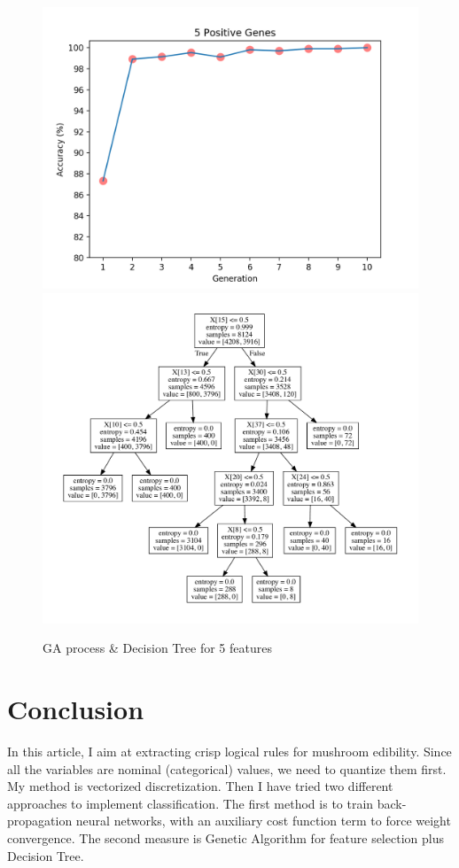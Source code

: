 \documentclass[runningheads]{llncs}
\begin{document}
\begin{figure}[H]
	\centering
	\includegraphics[scale=0.5]{GA5}
	\includegraphics[scale=0.5]{tree5}
	\caption{GA process \& Decision Tree for 5 features}
	\label{fig-5}
\end{figure}

\section{Conclusion}
In this article, I aim at extracting crisp logical rules for mushroom edibility. Since all the variables are nominal (categorical) values, we need to quantize them first. My method is vectorized discretization. Then I have tried two different approaches to implement classification. The first method is to train back-propagation neural networks, with an auxiliary cost function term to force weight convergence. The second measure is Genetic Algorithm for feature selection plus Decision Tree.
\end{document}
